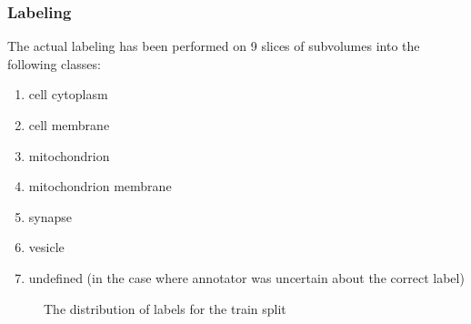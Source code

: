\documentclass{beamer}
\begin{document}
\begin{frame}
    \frametitle{Labeling}
    \begin{minipage}{0.49\textwidth}
        The actual labeling has been performed on 9 slices of subvolumes into the following classes:
        \begin{enumerate}
            \itemsep0em
            \item cell cytoplasm
            \item cell membrane
            \item mitochondrion
            \item mitochondrion membrane
            \item synapse
            \item vesicle
            \item undefined (in the case where annotator was uncertain about the correct label)
        \end{enumerate}
    \end{minipage}
    \begin{minipage}{0.49\textwidth}

        \begin{figure}[ht]
            \centering
            \caption{The distribution of labels for the train split}
            \label{fig:dist_labels}
        \end{figure}
    \end{minipage}
\end{frame}
\end{document}
